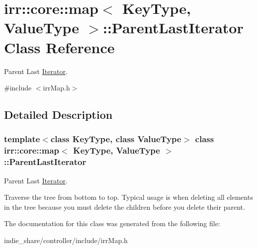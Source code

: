 \hypertarget{classirr_1_1core_1_1map_1_1ParentLastIterator}{}\section{irr\+:\+:core\+:\+:map$<$ Key\+Type, Value\+Type $>$\+:\+:Parent\+Last\+Iterator Class Reference}
\label{classirr_1_1core_1_1map_1_1ParentLastIterator}


Parent Last \hyperlink{classirr_1_1core_1_1map_1_1Iterator}{Iterator}.  




{\ttfamily \#include $<$irr\+Map.\+h$>$}



\subsection{Detailed Description}
\subsubsection*{template$<$class Key\+Type, class Value\+Type$>$\newline
class irr\+::core\+::map$<$ Key\+Type, Value\+Type $>$\+::\+Parent\+Last\+Iterator}

Parent Last \hyperlink{classirr_1_1core_1_1map_1_1Iterator}{Iterator}. 

Traverse the tree from bottom to top. Typical usage is when deleting all elements in the tree because you must delete the children before you delete their parent. 

The documentation for this class was generated from the following file\+:\begin{DoxyCompactItemize}
\item 
indie\+\_\+share/controller/include/irr\+Map.\+h\end{DoxyCompactItemize}

